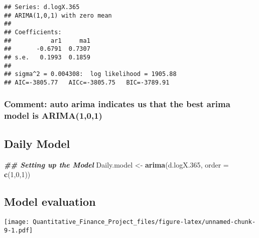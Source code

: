 \documentclass[
]{article}
\newenvironment{Shaded}{\begin{snugshade}}{\end{snugshade}}
\newcommand{\AttributeTok}[1]{\textcolor[rgb]{0.13,0.29,0.53}{#1}}
\newcommand{\DecValTok}[1]{\textcolor[rgb]{0.00,0.00,0.81}{#1}}
\newcommand{\DocumentationTok}[1]{\textcolor[rgb]{0.56,0.35,0.01}{\textbf{\textit{#1}}}}
\newcommand{\FloatTok}[1]{\textcolor[rgb]{0.00,0.00,0.81}{#1}}
\newcommand{\FunctionTok}[1]{\textcolor[rgb]{0.13,0.29,0.53}{\textbf{#1}}}
\newcommand{\NormalTok}[1]{#1}
\newcommand{\OtherTok}[1]{\textcolor[rgb]{0.56,0.35,0.01}{#1}}
\newcommand{\SpecialCharTok}[1]{\textcolor[rgb]{0.81,0.36,0.00}{\textbf{#1}}}
\begin{document}
\begin{verbatim}
## Series: d.logX.365 
## ARIMA(1,0,1) with zero mean 
## 
## Coefficients:
##           ar1     ma1
##       -0.6791  0.7307
## s.e.   0.1993  0.1859
## 
## sigma^2 = 0.004308:  log likelihood = 1905.88
## AIC=-3805.77   AICc=-3805.75   BIC=-3789.91
\end{verbatim}

\hypertarget{comment-auto-arima-indicates-us-that-the-best-arima-model-is-arima101}{%
\subsubsection{Comment: auto arima indicates us that the best arima
model is
ARIMA(1,0,1)}\label{comment-auto-arima-indicates-us-that-the-best-arima-model-is-arima101}}

\hypertarget{daily-model}{%
\subsection{Daily Model}\label{daily-model}}

\begin{Shaded}
\begin{Highlighting}[]
\DocumentationTok{\#\# Setting up the Model}
\NormalTok{Daily.model }\OtherTok{\textless{}{-}} \FunctionTok{arima}\NormalTok{(d.logX}\FloatTok{.365}\NormalTok{, }\AttributeTok{order =} \FunctionTok{c}\NormalTok{(}\DecValTok{1}\NormalTok{,}\DecValTok{0}\NormalTok{,}\DecValTok{1}\NormalTok{))}
\end{Highlighting}
\end{Shaded}

\hypertarget{model-evaluation}{%
\subsection{Model evaluation}\label{model-evaluation}}

\begin{Shaded}
\end{Shaded}

\texttt{[image: Quantitative\_Finance\_Project\_files/figure-latex/unnamed-chunk-9-1.pdf]}
\end{document}
